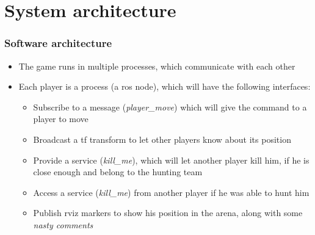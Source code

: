 \documentclass[]{beamer}
\newcommand{\cred}[1] {\textcolor{red}{#1}}
\begin{document}
\section{System architecture} 
\begin{frame}\frametitle{Software architecture}
\begin{itemize}
\item The game runs in multiple processes, which communicate with each other
\item Each player is a process (a ros node), which will have the following interfaces: 
\begin{itemize}
\item Subscribe to a message (\textit{player\_move}) which will give the command to a
player to move
\item Broadcast a tf transform to let other players know about its position
\item Provide a service (\textit{kill\_me}), which will let another player kill
him, if he is close enough and belong to the hunting team
\item Access a service (\textit{kill\_me}) from another player if he was able to
hunt him
\item Publish rviz markers to show his position in the arena, along with some
\textit{nasty comments}
\end{itemize}
\end{itemize}
\end{frame}


\end{document}
